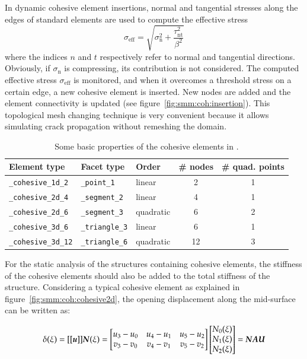 In dynamic cohesive element insertions, normal and tangential stresses
along the edges of standard elements are used to compute the effective
stress
\begin{equation}
  \sigma_\mathrm{eff} = \sqrt{\sigma_\mathrm{n}^2 +
    \frac{\tau_\mathrm{nt}^2}{\beta^2}}
\end{equation}
where the indices $n$ and $t$ respectively refer to normal and
tangential directions. Obviously, if $\sigma_\mathrm{n}$ is
compressing, its contribution is not considered. The computed
effective stress $\sigma_\mathrm{eff}$ is monitored, and when it
overcomes a threshold stress on a certain edge, a new cohesive element
is inserted. New nodes are added and the element connectivity is
updated (see figure~\ref{fig:smm:coh:insertion}). This topological
mesh changing technique is very convenient because it allows
simulating crack propagation without remeshing the domain.

\begin{table}[!htb]
\begin{center}
\begin{tabular}{l|llcc}
\toprule
Element type & Facet type & Order & \# nodes & \# quad. points  \\
\midrule
\texttt{\_cohesive\_1d\_2} & \texttt{\_point\_1} & linear & 2 & 1  \\
\hline
\texttt{\_cohesive\_2d\_4} & \texttt{\_segment\_2} & linear & 4 & 1  \\
\texttt{\_cohesive\_2d\_6} & \texttt{\_segment\_3} & quadratic & 6 & 2  \\
\hline
\texttt{\_cohesive\_3d\_6} & \texttt{\_triangle\_3} & linear & 6 & 1  \\
\texttt{\_cohesive\_3d\_12} & \texttt{\_triangle\_6} & quadratic & 12 & 3  \\
\bottomrule
\end{tabular}
\end{center}
\caption{Some basic properties of the cohesive elements in \akantu.}
\label{tab:cohesive_elements}
\end{table}

For the static analysis of the structures containing cohesive
elements, the stiffness of the cohesive elements should also be added
to the total stiffness of the structure. Considering a typical
cohesive element as explained in figure~\ref{fig:smm:coh:cohesive2d},
the opening displacement along the mid-surface can be written as:

\begin{equation}
  \label{eq:opening}
  \delta(\xi) = [[\boldsymbol{u}]] \boldsymbol{N}(\xi) =
  \begin{bmatrix}
    u_3-u_0 & u_4-u_1 & u_5-u_2\\
    v_3-v_0 & v_4-v_1 & v_5-v_2
  \end{bmatrix}
  \begin{bmatrix}
    N_0(\xi) \\ N_1(\xi) \\ N_2(\xi)
  \end{bmatrix} =
  \boldsymbol{N A U}
\end{equation}

